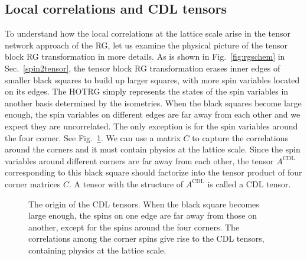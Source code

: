 \documentclass[aps,prb,reprint,superscriptaddress,floatfix]{revtex4-2}
\begin{document}
\subsection{Local correlations and CDL tensors\label{CDLten}} To
understand how the local correlations at the lattice scale arise in the
tensor network approach of the RG, let us examine the physical picture
of the tensor block RG transformation in more details. As is shown in
Fig.~\ref{fig:rgschem} in Sec.~\ref{spin2tensor}, the tensor block RG
transformation erases inner edges of smaller black squares to build up
larger squares, with more spin variables located on its edges. The HOTRG
simply represents the states of the spin variables in another basis
determined by the isometries. When the black squares become large
enough, the spin variables on different edges are far away from each
other and we expect they are uncorrelated. The only exception is for the
spin variables around the four corner. See Fig.~\ref{fig:ariseCDL}. We
can use a matrix $C$ to capture the correlations around the corners and
it must contain physics at the lattice scale. Since the spin variables
around different corners are far away from each other, the tensor
$A^{\text{CDL}}$ corresponding to this black square should factorize
into the tensor product of four corner matrices $C$. A tensor with the
structure of $A^{\text{CDL}}$ is called a CDL tensor.
%
\begin{figure}[ht]
     \caption{\label{fig:ariseCDL}The origin of the
        CDL tensors. When the black square becomes large enough, the
        spins on one edge are far away from those on another, except for
        the spins around the four corners. The correlations among the
corner spins give rise to the CDL tensors, containing physics at the
lattice scale.} 
\end{figure}
%
\end{document}

